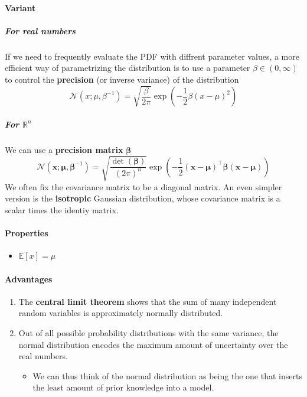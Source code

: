 \documentclass[12pt, a4paper]{article}
\def\vx{\boldsymbol{x}}
\def\vmu{\boldsymbol{\mu}}
\def\vbeta{\boldsymbol{\beta}}
\newcommand{\ND}[3]{\mathcal{N}(#1;#2,#3)}
\begin{document}
\paragraph{Variant}
\subparagraph{For real numbers}
If we need to frequently evaluate the PDF with diffrent parameter values, a more efficient way of parametrizing the distribution is to use a parameter $\beta \in (0,\infty)$ to control the \textbf{precision} (or inverse variance) of the distribution
\[
    \ND{x}{\mu}{\beta^{-1}} = \sqrt{\frac{\beta}{2\pi}} \exp\left( -\frac{1}{2}\beta(x-\mu)^2 \right)
\]
\subparagraph{For $\mathbb{R}^n$}
We can use a \textbf{precision matrix} $\vbeta$
\[
    \ND{\vx}{\vmu}{\vbeta^{-1}} = \sqrt{\frac{\det(\vbeta)}{(2\pi)^n}} \exp\left(-\frac{1}{2}(\vx-\vmu)^\top\vbeta(\vx-\vmu) \right)
\]
We often fix the covariance matrix to be a diagonal matrix. An even simpler version is the \textbf{isotropic} Gaussian distribution, whose covariance matrix is a scalar times the identiy matrix.
\paragraph{Properties}
\begin{itemize}
    \item $\mathbb{E}[x] = \mu$
\end{itemize}
\paragraph{Advantages}
\begin{enumerate}
    \item The \textbf{central limit theorem} shows that the sum of many independent random variables is approximately normally distributed.
    \item Out of all possible probability distributions with the same variance, the normal distribution encodes the maximum amount of uncertainty over the real numbers.
        \begin{itemize}
            \item We can thus think of the normal distribution as being the one that inserts the least amount of prior knowledge into a model.
        \end{itemize}
\end{enumerate}
\end{document}
